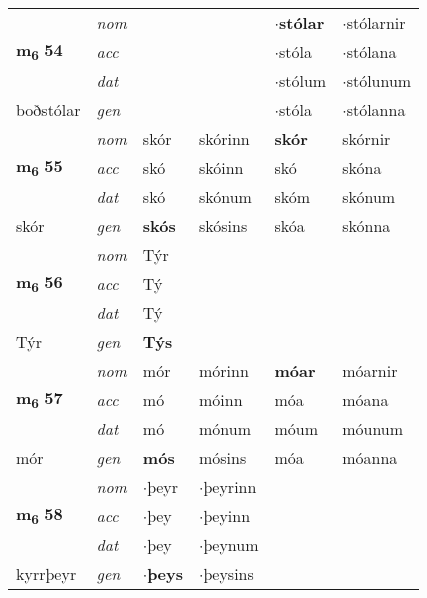\begin{longtable}[l]{llllll}
\multirow{3}{*}{{{\textbf{m{\textsubscript{6}}} \Large{\textbf{54}}}}}  & {\footnotesize{{\textit{nom}}}} &  &     & \textbf{$\cdot$stólar} & $\cdot$stólarnir  \\*
 &  {\footnotesize{{\textit{acc}}}} &   &    & $\cdot$stóla  & $\cdot$stólana \\*
 &  {\footnotesize{{\textit{dat}}}} &  &    & $\cdot$stólum & $\cdot$stólunum \\*
 {\footnotesize{boðstólar}} &   {\footnotesize{{\textit{gen}}}} & \textbf{}  &   & $\cdot$stóla & $\cdot$stólanna \\
\cmidrule{1-6}


\multirow{3}{*}{{{\textbf{m{\textsubscript{6}}} \Large{\textbf{55}}}}}  & {\footnotesize{{\textit{nom}}}} & skór & skórinn    & \textbf{skór} & skórnir  \\*
 &  {\footnotesize{{\textit{acc}}}} & skó  & skóinn   & skó  & skóna \\*
 &  {\footnotesize{{\textit{dat}}}} & skó & skónum   & skóm & skónum \\*
 {\footnotesize{skór}} &   {\footnotesize{{\textit{gen}}}} & \textbf{skós}  & skósins  & skóa & skónna \\
\cmidrule{1-6}


\multirow{3}{*}{{{\textbf{m{\textsubscript{6}}} \Large{\textbf{56}}}}}  & {\footnotesize{{\textit{nom}}}} & Týr &     & \textbf{} &   \\*
 &  {\footnotesize{{\textit{acc}}}} & Tý  &    &   &  \\*
 &  {\footnotesize{{\textit{dat}}}} & Tý &    &  &  \\*
 {\footnotesize{Týr}} &   {\footnotesize{{\textit{gen}}}} & \textbf{Týs}  &   &  &  \\
\cmidrule{1-6}


\multirow{3}{*}{{{\textbf{m{\textsubscript{6}}} \Large{\textbf{57}}}}}  & {\footnotesize{{\textit{nom}}}} & mór & mórinn    & \textbf{móar} & móarnir  \\*
 &  {\footnotesize{{\textit{acc}}}} & mó  & móinn   & móa  & móana \\*
 &  {\footnotesize{{\textit{dat}}}} & mó & mónum   & móum & móunum \\*
 {\footnotesize{mór}} &   {\footnotesize{{\textit{gen}}}} & \textbf{mós}  & mósins  & móa & móanna \\
\cmidrule{1-6}


\multirow{3}{*}{{{\textbf{m{\textsubscript{6}}} \Large{\textbf{58}}}}}  & {\footnotesize{{\textit{nom}}}} & $\cdot$þeyr & $\cdot$þeyrinn    & \textbf{} &   \\*
 &  {\footnotesize{{\textit{acc}}}} & $\cdot$þey  & $\cdot$þeyinn   &   &  \\*
 &  {\footnotesize{{\textit{dat}}}} & $\cdot$þey & $\cdot$þeynum   &  &  \\*
 {\footnotesize{kyrrþeyr}} &   {\footnotesize{{\textit{gen}}}} & \textbf{$\cdot$þeys}  & $\cdot$þeysins  &  &  \\
\cmidrule{1-6}



\end{longtable}
